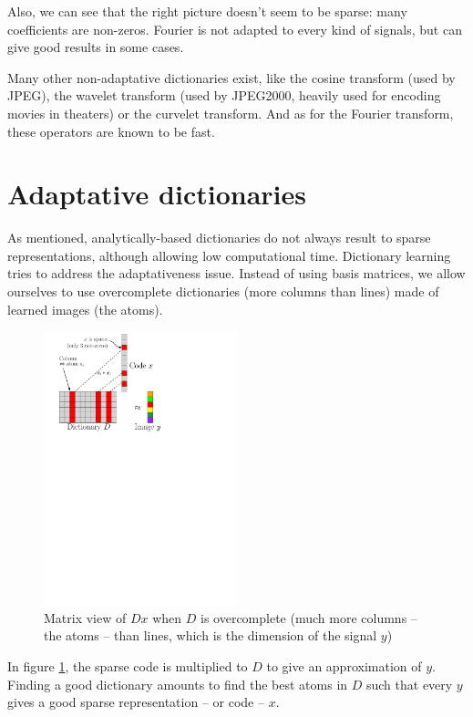 Also, we can see that the right picture doesn't seem to be sparse: many coefficients are non-zeros. Fourier is not adapted to every kind of signals, but can give good results in some cases.

Many other non-adaptative dictionaries exist, like the cosine transform (used by JPEG), the wavelet transform (used by JPEG2000, heavily used for encoding movies in theaters) or the curvelet transform. And as for the Fourier transform, these operators are known to be fast.

\section{Adaptative dictionaries}
As mentioned, analytically-based dictionaries do not always result to sparse representations, although allowing low computational time. Dictionary learning tries to address the adaptativeness issue. Instead of using basis matrices, we allow ourselves to use overcomplete dictionaries (more columns than lines) made of learned images (the atoms).
\begin{figure}[!h] \centering
\includegraphics[width=0.5\textwidth]{figures/sparsity-matrix.pdf}
\caption{Matrix view of $Dx$ when $D$ is overcomplete (much more columns – the atoms – than lines, which is the dimension of the signal $y$) \label{fig_overcomplete_matrix}}
\end{figure}
In figure \ref{fig_overcomplete_matrix}, the sparse code is multiplied to $D$ to give an approximation of $y$. Finding a good dictionary amounts to find the best atoms in $D$ such that every $y$ gives a good sparse representation – or code – $x$.

